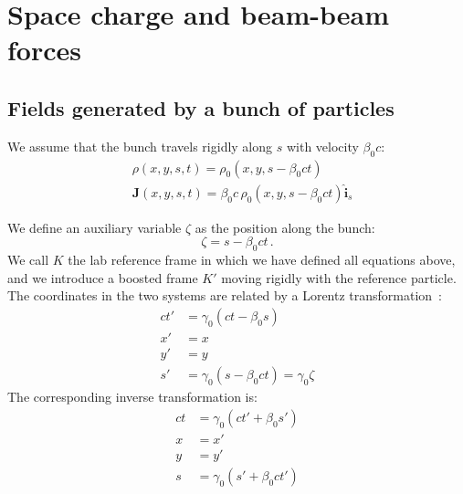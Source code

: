 \chapter{Space charge and beam-beam forces}

\section{Fields generated by a bunch of particles}



We assume that the bunch travels rigidly along $s$ with velocity $\beta_0 c$:
\begin{align}
&\rho\left(x, y, s, t\right) = \rho_0\left(x, y, s - \beta_0 ct\right) \label{rhorho0}\\
&\textbf{J}\left(x, y, s, t\right) = \beta_0c\, \rho_0\left(x, y, s - \beta_0 ct\right)  \hat{\textbf{i}}_s \label{JJ0}
\end{align}

We define an auxiliary variable $\zeta$ as the position along the bunch:
\begin{equation}
\zeta = s -\beta_0 c t \, .\label{zetadef}
\end{equation}
We call $K$ the lab reference frame in which we have defined all equations above, and we introduce a boosted frame $K'$ moving rigidly with the reference particle.
The coordinates in the two systems are related by a Lorentz transformation~\cite{jackson}:
\begin{align}
ct' &= \gamma_0 \left(ct -\beta_0 s \right)\label{lorA}\\
x' &= x\label{lorX}\\
y' &= y\label{lorY}\\
s' &= \gamma_0 \left(s -\beta_0 ct \right) = \gamma_0 \zeta\label{lorB}
\end{align}
The  corresponding inverse transformation is:
\begin{align}
ct &= \gamma_0 \left(ct' +\beta_0 s' \right)\label{lorC}\\
x &= x'\label{lorXinv}\\
y &= y'\label{lorYinv}\\
s &= \gamma_0 \left(s' +\beta_0 ct' \right)\label{lorD}
\end{align}



